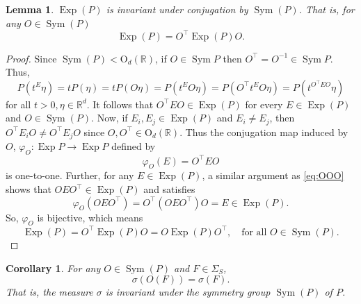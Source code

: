 \documentclass[11pt]{article}
\theoremstyle{theorem}
\newtheorem{lemma}[theorem]{Lemma}
\newtheorem{corollary}[theorem]{Corollary}
\newcommand\OdR{\mbox{O}_d(\mathbb{R})}
\newcommand\Sym{\operatorname{Sym}}
\newcommand\Exp{\operatorname{Exp}}
\newcommand\R{\mathbb{R}}
\begin{document}
\begin{lemma}\label{lem:ExpP}
$\Exp(P)$ is invariant under conjugation by $\Sym(P)$. That is, for any  $O \in \Sym{(P)} $
\begin{equation*}
    \Exp(P) = O^\top \Exp(P) O.
\end{equation*}
\end{lemma}

\begin{proof}
Since $\Sym(P) < \OdR{}$, if $O\in \Sym{P}$ then $O^\top = O^{-1} \in \Sym{P}$. Thus,
\begin{equation}\label{eq:OOO}
    P(t^E \eta) = tP(\eta) = tP(O\eta) = P(t^E O\eta) = P(O^\top t^E O \eta) = P(t^{O^\top E O }\eta)
\end{equation}
for all $t>0,\eta\in \R^d$. It follows that $O^\top E O \in \Exp(P)$ for every $E\in \Exp(P)$ and $O\in \Sym(P)$.  
Now, if $E_i, E_j\in \Exp(P)$ and $E_i\neq E_j$, then $O^\top E_i O \neq O^\top E_j O$ since $O,O^\top\in \OdR{}$. Thus the conjugation map induced by $O$, $\varphi_O: \Exp{P}\to \Exp{P}$ defined by 
\begin{equation*}
    \varphi_O (E) = O^\top E O
\end{equation*}
is one-to-one. Further, for any $E\in \Exp(P)$, a similar argument as \eqref{eq:OOO} shows that $OEO^\top \in \Exp(P)$ and satisfies
\begin{equation*}
    \varphi_O(OEO^\top) = O^\top (OEO^\top) O = E\in \Exp{(P)}.
\end{equation*}
So, $\varphi_O$ is bijective, which means 
\begin{equation*}
    \Exp(P) = O^\top \Exp(P) O = O \Exp{(P)} O^\top, \quad \text{for all } O\in \Sym{(P)}.
\end{equation*}
\end{proof}



\begin{corollary}
For any $O\in\Sym(P)$ and $F\in\Sigma_S$,
\begin{equation*}
\sigma(O (F))=\sigma(F).
\end{equation*} 
That is, the measure $\sigma$ is invariant under the symmetry group $\Sym(P)$ of $P$. 
\end{corollary}
\end{document}
